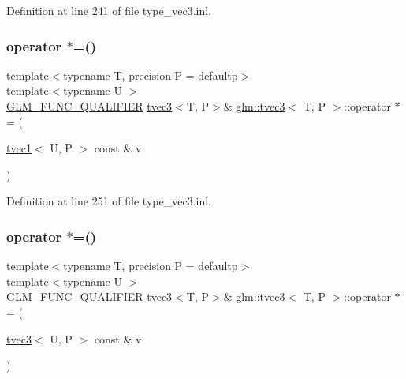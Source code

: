 Definition at line 241 of file type\+\_\+vec3.\+inl.

\mbox{\label{structglm_1_1tvec3_a3944c2ea5161c952d59f123b52308087}} 
\subsubsection{\texorpdfstring{operator $\ast$=()}{operator *=()}\hspace{0.1cm}{\footnotesize\ttfamily [5/6]}}
{\footnotesize\ttfamily template$<$typename T, precision P = defaultp$>$ \\
template$<$typename U $>$ \\
\mbox{\hyperlink{setup_8hpp_a33fdea6f91c5f834105f7415e2a64407}{G\+L\+M\+\_\+\+F\+U\+N\+C\+\_\+\+Q\+U\+A\+L\+I\+F\+I\+ER}} \mbox{\hyperlink{structglm_1_1tvec3}{tvec3}}$<$T, P$>$\& \mbox{\hyperlink{structglm_1_1tvec3}{glm\+::tvec3}}$<$ T, P $>$\+::operator $\ast$= (\begin{DoxyParamCaption}\item[{\mbox{\hyperlink{structglm_1_1tvec1}{tvec1}}$<$ U, P $>$ const \&}]{v }\end{DoxyParamCaption})}



Definition at line 251 of file type\+\_\+vec3.\+inl.

\mbox{\label{structglm_1_1tvec3_ac4e437eb1d0eb6b56ad3927d1bdc1b0a}} 
\subsubsection{\texorpdfstring{operator $\ast$=()}{operator *=()}\hspace{0.1cm}{\footnotesize\ttfamily [6/6]}}
{\footnotesize\ttfamily template$<$typename T, precision P = defaultp$>$ \\
template$<$typename U $>$ \\
\mbox{\hyperlink{setup_8hpp_a33fdea6f91c5f834105f7415e2a64407}{G\+L\+M\+\_\+\+F\+U\+N\+C\+\_\+\+Q\+U\+A\+L\+I\+F\+I\+ER}} \mbox{\hyperlink{structglm_1_1tvec3}{tvec3}}$<$T, P$>$\& \mbox{\hyperlink{structglm_1_1tvec3}{glm\+::tvec3}}$<$ T, P $>$\+::operator $\ast$= (\begin{DoxyParamCaption}\item[{\mbox{\hyperlink{structglm_1_1tvec3}{tvec3}}$<$ U, P $>$ const \&}]{v }\end{DoxyParamCaption})}



